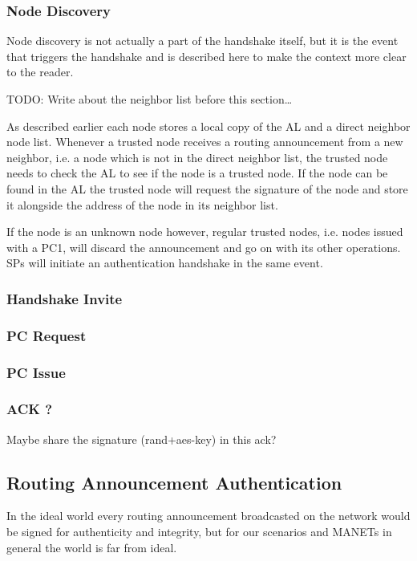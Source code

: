 \subsubsection*{Node Discovery}
Node discovery is not actually a part of the handshake itself, but it is the
event that triggers the handshake and is described here to make the context more
clear to the reader.

TODO: Write about the neighbor list before this section\ldots

As described earlier each node stores a local copy of the \ac{AL} and a direct
neighbor node list. Whenever a trusted node receives a routing announcement from
a new neighbor, i.e. a node which is not in the direct neighbor list, the
trusted node needs to check the \ac{AL} to see if the node is a trusted node. If
the node can be found in the \ac{AL} the trusted node will request the signature
of the node and store it alongside the address of the node in its neighbor list.

If the node is an unknown node however, regular trusted nodes, i.e. nodes issued
with a \ac{PC1}, will discard the announcement and go on with its other
operations. \acp{SP} will initiate an authentication handshake in the same
event.

\subsubsection*{Handshake Invite}

\subsubsection*{\acf{PC} Request}

\subsubsection*{\acf{PC} Issue}

\subsubsection*{ACK ?}
Maybe share the signature (rand+aes-key) in this ack?



\subsection{Routing Announcement Authentication}
In the ideal world every routing announcement broadcasted on the network would
be signed for authenticity and integrity, but for our scenarios and \acp{MANET}
in general the world is far from ideal.

